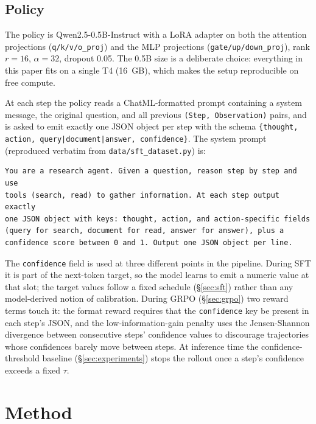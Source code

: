 \documentclass[11pt]{article}
\begin{document}
\subsection{Policy}
\label{sec:policy}
The policy is Qwen2.5-0.5B-Instruct \cite{qwen25} with a LoRA
adapter on both the attention projections (\texttt{q/k/v/o\_proj}) and
the MLP projections (\texttt{gate/up/down\_proj}), rank $r{=}16$,
$\alpha{=}32$, dropout 0.05. The 0.5B size is a deliberate choice:
everything in this paper fits on a single T4 (16~GB), which makes the
setup reproducible on free compute.

At each step the policy reads a ChatML-formatted prompt containing a
system message, the original question, and all previous
\texttt{(Step, Observation)} pairs, and is asked to emit exactly one
JSON object per step with the schema
\texttt{\{thought, action, query|document|answer, confidence\}}. The
system prompt (reproduced verbatim from \texttt{data/sft\_dataset.py})
is:

\begin{lstlisting}
You are a research agent. Given a question, reason step by step and use
tools (search, read) to gather information. At each step output exactly
one JSON object with keys: thought, action, and action-specific fields
(query for search, document for read, answer for answer), plus a
confidence score between 0 and 1. Output one JSON object per line.
\end{lstlisting}

The \texttt{confidence} field is used at three different points in the
pipeline. During SFT it is part of the next-token target, so the model
learns to emit a numeric value at that slot; the target values follow a
fixed schedule (§\ref{sec:sft}) rather than any model-derived notion of
calibration. During GRPO (§\ref{sec:grpo}) two reward terms touch it:
the format reward requires that the \texttt{confidence} key be present
in each step's JSON, and the low-information-gain penalty uses the
Jensen-Shannon divergence between consecutive steps' confidence values
to discourage trajectories whose confidences barely move between steps.
At inference time the confidence-threshold baseline
(§\ref{sec:experiments}) stops the rollout once a step's confidence
exceeds a fixed $\tau$.

\section{Method}
\label{sec:method}
\end{document}
